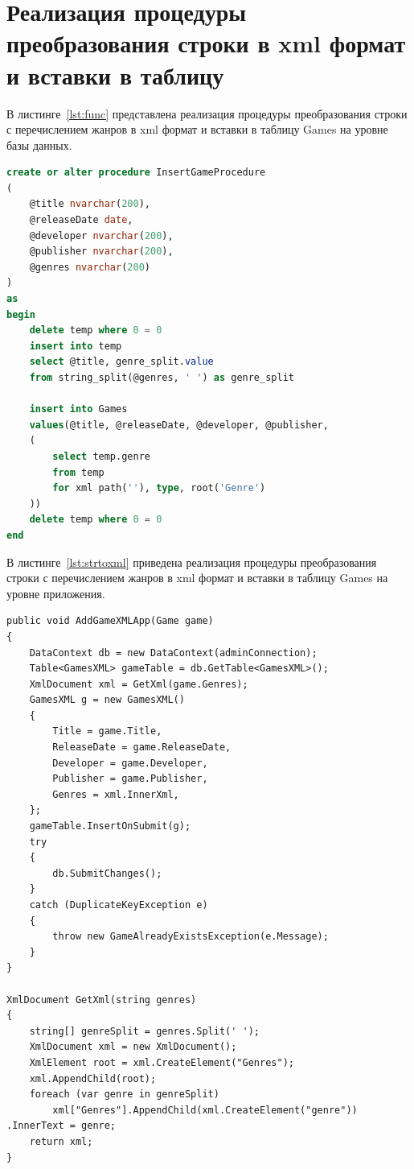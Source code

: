 \section{Реализация процедуры преобразования строки в xml формат и вставки в таблицу}

В листинге~\ref{lst:func} представлена реализация процедуры преобразования строки с перечислением жанров в xml формат и вставки в таблицу Games на уровне базы данных. 

\begin{lstlisting}[label=lst:func, caption=Процедура преобразования строки в xml формат и вставки в таблицу на уровне базы данных,language=SQL]
create or alter procedure InsertGameProcedure
(
	@title nvarchar(200),
	@releaseDate date,
	@developer nvarchar(200),
	@publisher nvarchar(200),
	@genres nvarchar(200)
)
as
begin
	delete temp where 0 = 0
	insert into temp
	select @title, genre_split.value
	from string_split(@genres, ' ') as genre_split

	insert into Games
	values(@title, @releaseDate, @developer, @publisher,
	(
		select temp.genre
		from temp
		for xml path(''), type, root('Genre')
	))
	delete temp where 0 = 0
end
\end{lstlisting}

В листинге~\ref{lst:strtoxml} приведена реализация процедуры преобразования строки с перечислением жанров в xml формат и вставки в таблицу Games на уровне приложения.

\begin{lstlisting}[label=lst:strtoxml, caption=Метод преобразования строки в xml формат и вставки в таблицу на уровне приложения]
public void AddGameXMLApp(Game game)
{
	DataContext db = new DataContext(adminConnection);
	Table<GamesXML> gameTable = db.GetTable<GamesXML>();
	XmlDocument xml = GetXml(game.Genres);
	GamesXML g = new GamesXML()
	{
		Title = game.Title,
		ReleaseDate = game.ReleaseDate,
		Developer = game.Developer,
		Publisher = game.Publisher,
		Genres = xml.InnerXml,
	};
	gameTable.InsertOnSubmit(g);
	try
	{
		db.SubmitChanges();
	}
	catch (DuplicateKeyException e)
	{
		throw new GameAlreadyExistsException(e.Message);
	}
}

XmlDocument GetXml(string genres)
{
	string[] genreSplit = genres.Split(' ');
	XmlDocument xml = new XmlDocument();
	XmlElement root = xml.CreateElement("Genres");
	xml.AppendChild(root);
	foreach (var genre in genreSplit)
		xml["Genres"].AppendChild(xml.CreateElement("genre")) .InnerText = genre;
	return xml;
}
\end{lstlisting}

